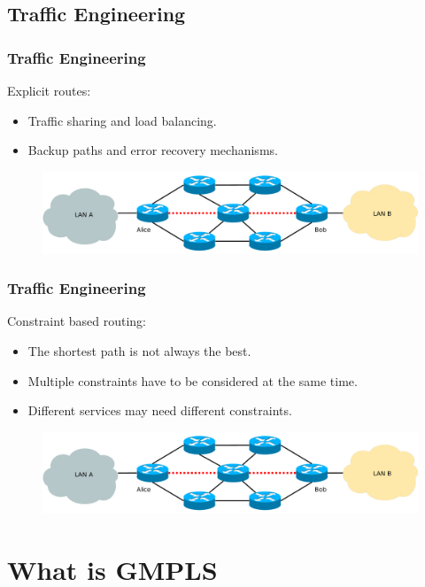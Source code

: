 \documentclass{beamer}
\begin{document}
\subsection{Traffic Engineering}
\frame
{
  \frametitle{Traffic Engineering}

  Explicit routes:
  \begin{itemize}
  \item Traffic sharing and load balancing.
  \item Backup paths and error recovery mechanisms.
  \end{itemize}

  \begin{figure}[!hbp]
    \centering
    \includegraphics[width=1\textwidth]{img/mpls_te}
  \end{figure}
}
\frame
{
  \frametitle{Traffic Engineering}

  Constraint based routing:
  \begin{itemize}
  \item The shortest path is not always the best.
  \item Multiple constraints have to be considered at the same time.
  \item Different services may need different constraints.
  \end{itemize}

  \begin{figure}[!hbp]
    \centering
    \includegraphics[width=1\textwidth]{img/mpls_te}
  \end{figure}
}

\section{What is GMPLS}
\end{document}
